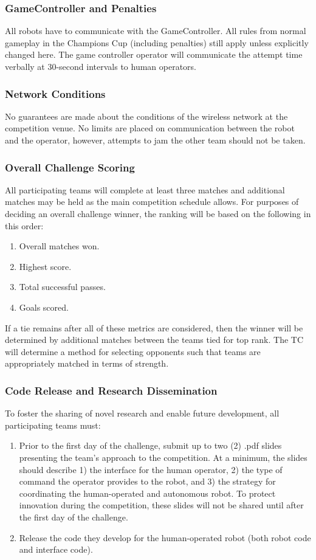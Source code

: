 \subsubsection{GameController and Penalties}
All robots have to communicate with the GameController. All rules from normal gameplay in the Champions Cup (including penalties) still apply unless explicitly changed here. The game controller operator will communicate the attempt time verbally at 30-second intervals to human operators.

\subsubsection{Network Conditions}
No guarantees are made about the conditions of the wireless network at the competition venue. No limits are placed on communication between the robot and the operator, however, attempts to jam the other team should not be taken. 

\subsubsection{Overall Challenge Scoring}
All participating teams will complete at least three matches and additional matches may be held as the main competition schedule allows. For purposes of deciding an overall challenge winner, the ranking will be based on the following in this order:
\begin{enumerate}
	\item Overall matches won.
	\item Highest score.
	\item Total successful passes.
	\item Goals scored.
\end{enumerate}
If a tie remains after all of these metrics are considered, then the winner will be determined by additional matches between the teams tied for top rank. The TC will determine a method for selecting opponents such that teams are appropriately matched in terms of strength.

\subsubsection{Code Release and Research Dissemination}
To foster the sharing of novel research and enable future development, all participating teams must:
\begin{enumerate}
	\item Prior to the first day of the challenge, submit up to two (2) .pdf slides presenting the team's approach to the competition. At a minimum, the slides should describe 1) the interface for the human operator, 2) the type of command the operator provides to the robot, and 3) the strategy for coordinating the human-operated and autonomous robot. To protect innovation during the competition, these slides will not be shared until after the first day of the challenge.
	\item  Release the code they develop for the human-operated robot (both robot code and interface code).
\end{enumerate}

